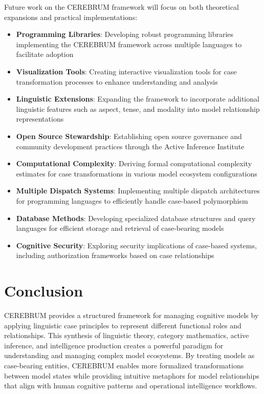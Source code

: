Future work on the CEREBRUM framework will focus on both theoretical
expansions and practical implementations:

\begin{itemize}
\tightlist
\item
  \textbf{Programming Libraries}: Developing robust programming
  libraries implementing the CEREBRUM framework across multiple
  languages to facilitate adoption
\item
  \textbf{Visualization Tools}: Creating interactive visualization tools
  for case transformation processes to enhance understanding and
  analysis
\item
  \textbf{Linguistic Extensions}: Expanding the framework to incorporate
  additional linguistic features such as aspect, tense, and modality
  into model relationship representations
\item
  \textbf{Open Source Stewardship}: Establishing open source governance
  and community development practices through the Active Inference
  Institute
\item
  \textbf{Computational Complexity}: Deriving formal computational
  complexity estimates for case transformations in various model
  ecosystem configurations
\item
  \textbf{Multiple Dispatch Systems}: Implementing multiple dispatch
  architectures for programming languages to efficiently handle
  case-based polymorphism
\item
  \textbf{Database Methods}: Developing specialized database structures
  and query languages for efficient storage and retrieval of
  case-bearing models
\item
  \textbf{Cognitive Security}: Exploring security implications of
  case-based systems, including authorization frameworks based on case
  relationships
\end{itemize}

\hypertarget{conclusion}{%
\section{Conclusion}\label{conclusion}}

CEREBRUM provides a structured framework for managing cognitive models
by applying linguistic case principles to represent different functional
roles and relationships. This synthesis of linguistic theory, category
mathematics, active inference, and intelligence production creates a
powerful paradigm for understanding and managing complex model
ecosystems. By treating models as case-bearing entities, CEREBRUM
enables more formalized transformations between model states while
providing intuitive metaphors for model relationships that align with
human cognitive patterns and operational intelligence workflows.


